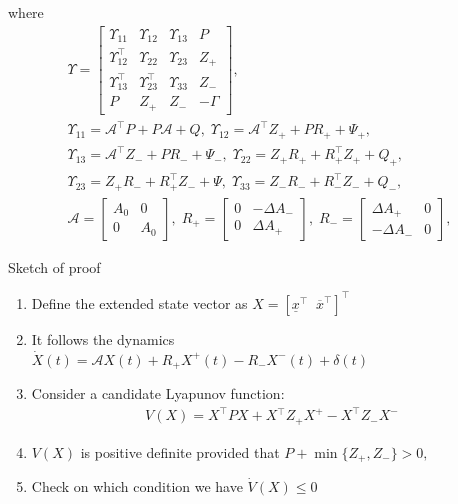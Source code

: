 \documentclass[slideopt,A4,showboxes,svgnames]{beamer}
\begin{document}
\begin{frame}
where{\footnotesize{}
	\begin{gather*}
	\Upsilon=\left[\begin{array}{cccc}
	\Upsilon_{11} & \Upsilon_{12} & \Upsilon_{13} & P\\
	\Upsilon_{12}^{\top} & \Upsilon_{22} & \Upsilon_{23} & Z_{+}\\
	\Upsilon_{13}^{\top} & \Upsilon_{23}^{\top} & \Upsilon_{33} & Z_{-}\\
	P & Z_{+} & Z_{-} & -\Gamma
	\end{array}\right],\\
	\Upsilon_{11}=\mathcal{A}^{\top}P+P\mathcal{A}+Q,\;\Upsilon_{12}=\mathcal{A}^{\top}Z_{+}+PR_{+}+\Psi_{+},\\
	\Upsilon_{13}=\mathcal{A}^{\top}Z_{-}+PR_{-}+\Psi_{-},\;\Upsilon_{22}=Z_{+}R_{+}+R_{+}^{\top}Z_{+}+Q_{+},\\
	\Upsilon_{23}=Z_{+}R_{-}+R_{+}^{\top}Z_{-}+\Psi,\;\Upsilon_{33}=Z_{-}R_{-}+R_{-}^{\top}Z_{-}+Q_{-},\\
	\mathcal{A}=\left[\begin{array}{cc}
	A_{0} & 0\\
	0 & A_{0}
	\end{array}\right],\;R_{+}=\left[\begin{array}{cc}
	0 & -\Delta A_{-}\\
	0 & \Delta A_{+}
	\end{array}\right],\;R_{-}=\left[\begin{array}{cc}
	\Delta A_{+} & 0\\
	-\Delta A_{-} & 0
	\end{array}\right],
	\end{gather*}
}
\end{frame}

\begin{frame}{Sketch of proof}
\begin{enumerate}
	\item Define the extended state vector as $X=[\underline{x}^{\top}\;\;\overline{x}^{\top}]^{\top}$
	\item It follows the dynamics $\dot{X}(t)=\mathcal{A}X(t)+R_{+}X^{+}(t)-R_{-}X^{-}(t)+\delta(t)$
	\item Consider a candidate Lyapunov function:
	\begin{gather*}
	V(X)=X^{\top}PX+X{}^{\top}Z_{+}X^{+}-X^{\top}Z_{-}X^{-}
	\end{gather*}
	\item $V(X)$ is positive definite provided that
	$
	P+\min\{Z_{+},Z_{-}\}>0,
	$
	\item Check on which condition we have $\dot{V}(X) \leq 0$
\end{enumerate}
\end{frame}
\end{document}
